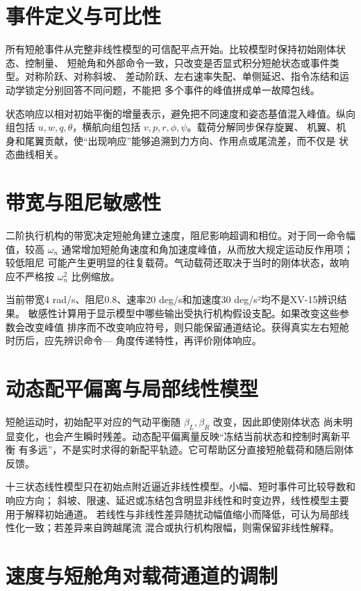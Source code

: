 \documentclass[UTF8,12pt,oneside,openany,fontset=windows]{ctexbook}
\begin{document}
\section{事件定义与可比性}

所有短舱事件从完整非线性模型的可信配平点开始。比较模型时保持初始刚体状态、控制量、 短舱角和外部命令一致，只改变是否显式积分短舱状态或事件类型。对称阶跃、对称斜坡、 差动阶跃、左右速率失配、单侧延迟、指令冻结和运动学锁定分别回答不同问题，不能把 多个事件的峰值拼成单一故障包线。

状态响应以相对初始平衡的增量表示，避免把不同速度和姿态基值混入峰值。纵向组包括 \(u,w,q,\theta\)，横航向组包括 \(v,p,r,\phi,\psi\)。载荷分解同步保存旋翼、 机翼、机身和尾翼贡献，使“出现响应”能够追溯到力方向、作用点或尾流差，而不仅是 状态曲线相关。

\section{带宽与阻尼敏感性}

二阶执行机构的带宽决定短舱角建立速度，阻尼影响超调和相位。对于同一命令幅值，较高 \(\omega_n\) 通常增加短舱角速度和角加速度峰值，从而放大规定运动反作用项；较低阻尼 可能产生更明显的往复载荷。气动载荷还取决于当时的刚体状态，故响应不严格按 \(\omega_n^2\) 比例缩放。

当前带宽4 rad/s、阻尼0.8、速率20 deg/s和加速度30 deg/s²均不是XV-15辨识结果。 敏感性计算用于显示模型中哪些输出受执行机构假设支配。如果改变这些参数会改变峰值 排序而不改变响应符号，则只能保留通道结论。获得真实左右短舱时历后，应先辨识命令— 角度传递特性，再评价刚体响应。

\section{动态配平偏离与局部线性模型}

短舱运动时，初始配平对应的气动平衡随 \(\beta_L,\beta_R\) 改变，因此即使刚体状态 尚未明显变化，也会产生瞬时残差。动态配平偏离量反映“冻结当前状态和控制时离新平衡 有多远”，不是实时求得的新配平轨迹。它可帮助区分直接短舱载荷和随后刚体反馈。

十三状态线性模型只在初始点附近逼近非线性模型。小幅、短时事件可比较导数和响应方向； 斜坡、限速、延迟或冻结包含明显非线性和时变边界，线性模型主要用于解释初始通道。 若线性与非线性差异随扰动幅值缩小而降低，可认为局部线性化一致；若差异来自跨越尾流 混合或执行机构限幅，则需保留非线性解释。

\section{速度与短舱角对载荷通道的调制}
\end{document}
